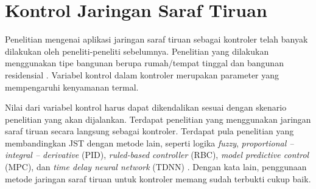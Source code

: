 \section{Kontrol Jaringan Saraf Tiruan}

Penelitian mengenai aplikasi jaringan saraf tiruan sebagai kontroler telah banyak dilakukan oleh peneliti-peneliti sebelumnya. Penelitian yang dilakukan menggunakan tipe bangunan berupa rumah/tempat tinggal \cite{paper22JJkim, paper22SKJung} dan bangunan residensial \cite{paper22JanDrgona}. Variabel kontrol dalam kontroler merupakan parameter yang mempengaruhi kenyamanan termal.

Nilai dari variabel kontrol harus dapat dikendalikan sesuai dengan skenario penelitian yang akan dijalankan. Terdapat penelitian yang menggunakan jaringan saraf tiruan secara langsung sebagai kontroler. Terdapat pula penelitian yang membandingkan JST dengan metode lain, seperti logika \textit{fuzzy}, \textit{proportional – integral – derivative} (PID), \textit{ruled-based controller} (RBC), \textit{model predictive control} (MPC), dan \textit{time delay neural network} (TDNN) \cite{paper22JanDrgona}. Dengan kata lain, penggunaan metode jaringan saraf tiruan untuk kontroler memang sudah terbukti cukup baik.



